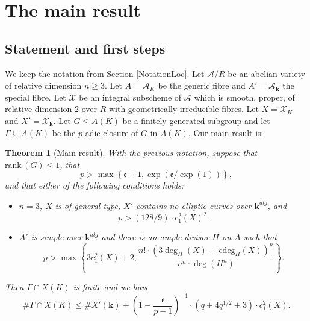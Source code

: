 \documentclass[11pt]{amsart}
\newtheorem{theorem}{Theorem}[section]
\theoremstyle{remark}
\numberwithin{equation}{section}
\newcommand{\efrak}{\mathfrak{e}}
\newcommand{\Acal}{\mathscr{A}}
\newcommand{\Xcal}{\mathscr{X}}
\newcommand{\kk}{\mathbf{k}}
\newcommand{\rk}{\mathrm{rank}\,}
\newcommand{\cdeg}{\,\mathrm{cdeg}}
\begin{document}

\section{The main result} \label{SecMainResult}

\subsection{Statement and first steps} We keep the notation from Section \ref{NotationLoc}. Let $\Acal/R$ be an abelian variety of relative dimension $n\ge 3$. Let $A=\Acal_K$ be the generic fibre and $A'=\Acal_\kk$ the special fibre. Let $\Xcal$ be an integral subscheme of $\Acal$ which is smooth, proper, of relative dimension $2$ over $R$ with geometrically irreducible fibres. Let $X=\Xcal_K$ and $X'=\Xcal_\kk$. Let $G\le A(K)$ be a finitely generated subgroup and let $\Gamma\subseteq A(K)$ be the $p$-adic closure of $G$ in $A(K)$. Our main result is:

\begin{theorem}[Main result]\label{ThmMain} With the previous notation, suppose that $\rk (G)\le 1$, that 
\begin{equation}\label{Eqnplarge}
p>\max\left\{\efrak+1, \exp(\efrak/\exp(1))\right\} , 
\end{equation}
and that either of the following conditions holds:
\begin{itemize}
\item[(i)] $n=3$, $X$ is of general type, $X'$ contains no elliptic curves over $\kk^{alg}$, and 
$$
p> (128/9)\cdot c_1^2(X)^2.
$$ 
\item[(ii)] $A'$ is simple over $\kk^{alg}$ and there is an ample divisor $H$ on $A$ such that
$$
p> \max\left\{3 c_1^2(X)+2,\frac{n!\cdot (3\deg_H(X) + \cdeg_H(X))^n}{n^n\cdot \deg(H^n)}\right\}.
$$
\end{itemize}
Then $\Gamma\cap X(K)$ is finite and we have
\begin{equation}\label{EqnMainBound}
\# \Gamma\cap X(K) \le \# X'(\kk) + \left(1-\frac{\efrak}{p-1}\right)^{-1}\cdot (q+4q^{1/2}+3)\cdot c_1^2(X).
\end{equation}
\end{theorem}
\end{document}
